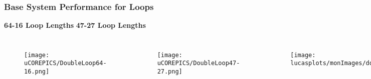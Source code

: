 \documentclass{beamer}
\begin{document}
\begin{frame}
\frametitle{Base System Performance for Loops}




\hspace{1cm} \textbf{64-16 Loop Lengths}
\hspace{2.5cm} \textbf{47-27 Loop Lengths}

\begin{columns}[c]

\begin{figure}

\texttt{[image: uCOREPICS/DoubleLoop64-16.png]}
\end{figure}

\begin{figure}
\texttt{[image: uCOREPICS/DoubleLoop47-27.png]}
\end{figure}

\begin{figure}
\texttt{[image: lucasplots/monImages/doubleLoopImage.png]}
\end{figure}

\end{columns}

\begin{itemize}

\end{itemize}

\end{frame}

\end{document}
